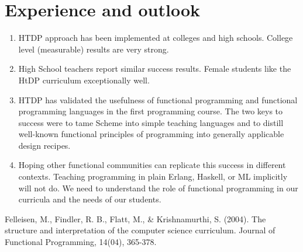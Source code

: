 \documentclass{article}
\begin{document}
\section{Experience and outlook}

\begin{enumerate}
\item HTDP approach has been implemented at colleges and high
  schools. College level (measurable) results are very strong.
\item High School teachers report similar success results. Female
  students like the HtDP curriculum exceptionally well.
\item HTDP has validated the usefulness of functional programming and
  functional programming languages in the first programming
  course. The two keys to success were to tame Scheme into simple
  teaching languages and to distill well-known functional principles
  of programming into generally applicable design recipes.
\item Hoping other functional communities can replicate this success
  in different contexts. Teaching programming in plain Erlang,
  Haskell, or ML implicitly will not do. We need to understand the
  role of functional programming in our curricula and the needs of our
  students.
\end{enumerate}




\begin{thebibliography}

    Felleisen, M., Findler, R. B., Flatt, M., & Krishnamurthi, S. (2004). The structure and interpretation of the computer science curriculum. Journal of Functional Programming, 14(04), 365-378.


\end{thebibliography}
\end{document}
